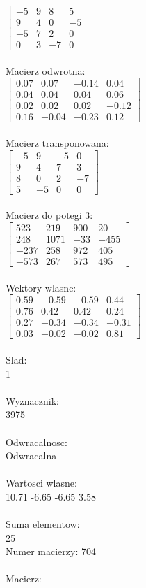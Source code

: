 \documentclass[a4paper,12pt]{article}
\begin{document}
$\begin{bmatrix} -5&9&8&5\\9&4&0&-5\\-5&7&2&0\\0&3&-7&0 \end{bmatrix}$
\\
\\
Macierz odwrotna:\\

$\begin{bmatrix} 0.07&0.07&-0.14&0.04\\0.04&0.04&0.04&0.06\\0.02&0.02&0.02&-0.12\\0.16&-0.04&-0.23&0.12 \end{bmatrix}$
\\
\\
Macierz transponowana:\\

$\begin{bmatrix} -5&9&-5&0\\9&4&7&3\\8&0&2&-7\\5&-5&0&0 \end{bmatrix}$
\\
\\
Macierz do potegi 3:\\

$\begin{bmatrix} 523&219&900&20\\248&1071&-33&-455\\-237&258&972&405\\-573&267&573&495 \end{bmatrix}$
\\
\\
Wektory wlasne:\\

$\begin{bmatrix} 0.59&-0.59&-0.59&0.44\\0.76&0.42&0.42&0.24\\0.27&-0.34&-0.34&-0.31\\0.03&-0.02&-0.02&0.81 \end{bmatrix}$
\\
\\
Slad:\\
1
\\
\\
Wyznacznik:\\
3975
\\
\\
Odwracalnosc:\\
Odwracalna
\\
\\
Wartosci wlasne:\\
10.71 -6.65 -6.65 3.58
\\
\\
Suma elementow:\\
25
\\
\newpage
Numer macierzy:
704
\\
\\
Macierz:\\
\end{document}
